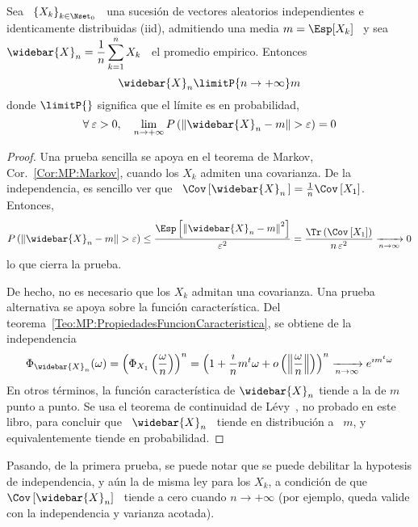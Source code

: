 \begin{teorema}
  Sea  \ $\left\{ X_k  \right\}_{k \in  \Nset_0}$ \  una sucesi\'on  de vectores
  aleatorios  independientes e identicamente  distribuidas (iid),  admitiendo una
  media  $m =  \Esp[X_k]$  \ y  sea  \ $\displaystyle  \widebar{X}_n =  \frac1n
  \sum_{k=1}^n X_k$ \ el promedio empirico. Entonces
  \[
  \widebar{X}_n \limitP{n \to +\infty} m
  \]
  donde $\limitP{}$ significa que el l\'imite es en probabilidad, \ie
  \[
  \forall  \:  \varepsilon  >0,  \quad  \lim_{n  \to  +\infty}  P\left(  \left\|
      \widebar{X}_n - m \right\| > \varepsilon \right) = 0
  \]
\end{teorema}
\begin{proof}
  Una    prueba    sencilla   se    apoya    en    el    teorema   de    Markov,
  Cor.~\ref{Cor:MP:Markov},  cuando  los $X_k$  admiten  una  covarianza. De  la
  independencia, es  sencillo ver que  \ $\Cov\left[ \widebar{X}_n \,  \right] =
  \frac1n \Cov\left[ X_1 \right]$. Entonces,
  \[
  P\left(  \left\|  \widebar{X}_n  -  m  \right\|  >  \varepsilon  \right)  \le
  \frac{\Esp\left[ \left\|  \widebar{X}_n - m\right\|^2 \right]}{\varepsilon^2}
  =  \frac{\Tr\left(   \Cov\left[  X_1  \right]   \right)}{n  \,  \varepsilon^2}
  \xrightarrow[n \to \infty]{} 0
  \]
  lo que cierra la prueba.

  De hecho,  no es necesario  que los $X_k$  admitan una covarianza.  Una prueba
  alternativa    se   apoya   sobre    la   funci\'on    caracter\'istica.   Del
  teorema~\ref{Teo:MP:PropiedadesFuncionCaracteristica},   se   obtiene  de   la
  independencia
  \[
  \Phi_{\widebar{X}_n}(\omega)   =  \left(   \Phi_{X_1}\left(  \frac{\omega}{n}
    \right) \right)^n = \left( 1 + \frac{\imath}{n} m^t \omega + o\left( \left\|
        \frac{\omega}{n} \right\| \right) \right)^n \xrightarrow[n \to \infty]{}
  e^{\imath m^t \omega}
  \]
  En otros t\'erminos, la funci\'on caracter\'istica de $\widebar{X}_n$ tiende a
  la   de  $m$   punto  a   punto.  Se   usa  el   teorema  de   continuidad  de
  L\'evy~\cite{AshDol99, AthLah06, Bil12, Coh13}, no probado en este libro, para
  concluir  que  \  $\widebar{X}_n$  \  tiende  en distribuci\'on  a  \  $m$,  y
  equivalentemente tiende en probabilidad.
\end{proof}
%
Pasando,  de  la primera  prueba,  se  puede notar  que  se  puede debilitar  la
hypotesis  de  independencia,  y  a\'un  la  de misma  ley  para  los  $X_k$,  a
condici\'on de que $\Cov\left[ \widebar{X}_n \right]$ \ tiende a cero cuando $n
\to +\infty$ (por ejemplo, queda valide con la independencia y varianza acotada).

